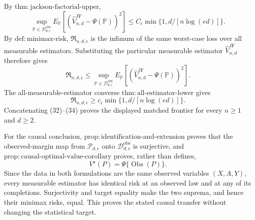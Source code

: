 By \(\mathrm{thm:jackson\text{-}factorial\text{-}upper}\),
\[
 \sup_{\mathbb P\in\mathcal D_{d,\epsilon}^{\mathrm{obs}}}
 E_{\mathbb P}[(\widehat V_{n,d}^{\mathrm{JF}}-\Psi(\mathbb P))^2]
 \leq C_\epsilon\min\{1,d/[n\log(ed)]\}.
 \tag{32}
\]
By \(\mathrm{def:minimax\text{-}risk}\), \(\mathfrak R_{n,d,\epsilon}\) is the infimum of the same worst-case loss over all measurable estimators.  Substituting the particular measurable estimator \(\widehat V_{n,d}^{\mathrm{JF}}\) therefore gives
\[
 \mathfrak R_{n,d,\epsilon}
 \leq\sup_{\mathbb P\in\mathcal D_{d,\epsilon}^{\mathrm{obs}}}
 E_{\mathbb P}[(\widehat V_{n,d}^{\mathrm{JF}}-\Psi(\mathbb P))^2].
 \tag{33}
\]
The all-measurable-estimator converse \(\mathrm{thm:all\text{-}estimator\text{-}lower}\) gives
\[
 \mathfrak R_{n,d,\epsilon}
 \geq c_\epsilon\min\{1,d/[n\log(ed)]\}.
 \tag{34}
\]
Concatenating (32)--(34) proves the displayed matched frontier for every \(n\geq1\) and \(d\geq2\).

For the causal conclusion, \(\mathrm{prop:identification\text{-}and\text{-}extension}\) proves that the observed-margin map from \(\mathcal P_{d,\epsilon}\) onto \(\mathcal D_{d,\epsilon}^{\mathrm{obs}}\) is surjective, and \(\mathrm{prop:causal\text{-}optimal\text{-}value\text{-}corollary}\) proves, rather than defines,
\[
 V^\star(P)=\Psi\{\operatorname{Obs}(P)\}.
\]
Since the data in both formulations are the same observed variables \((X,A,Y)\), every measurable estimator has identical risk at an observed law and at any of its completions.  Surjectivity and target equality make the two suprema, and hence their minimax risks, equal.  This proves the stated causal transfer without changing the statistical target.